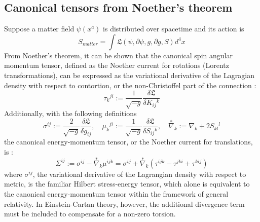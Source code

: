 \documentclass[12pt]{article}
\begin{document}
\subsection{Canonical tensors from Noether's theorem}
Suppose a matter field $\psi(x^a)$ is distributed over spacetime and its action is
\[ S_{matter} = \int \mathfrak{L}(\psi,\partial\psi, g,\partial g, S) d^4x \]
From Noether's theorem, it can be shown that the canonical spin angular momentum tensor, defined as the Noether current for rotations (Lorentz transformations), can be expressed as the variational derivative of the Lagragian density with respect to contortion, or the non-Christoffel part of the connection \cite{hehl1976general}:
\[\tau_k{}^{ji} := \frac{1}{\sqrt{-g}}\frac{\delta\mathfrak{L}}{\delta K_{ij}{}^k}\]
Additionally, with the following definitions
\[ \sigma^{ij} := \frac{2}{\sqrt{-g}}\frac{\delta\mathfrak{L}}{\delta g_{ij}},
\quad \mu_{k}{}^{ji} := \frac{1}{\sqrt{-g}}\frac{\delta\mathfrak{L}}{\delta S_{ij}{}^k},
\quad \stackrel{*}{\nabla}_k := \nabla_k + 2S_{kl}{}^l\]
the canonical energy-momentum tensor, or the Noether current for translations, is \cite{hehl1976general}:
 \[ \Sigma^{ij} := \sigma^{ij} - \stackrel{*}{\nabla}_k\mu^{ijk}  = \sigma^{ij} + \stackrel{*}{\nabla}_k(\tau^{ijk} - \tau^{jki} + \tau^{kij})\]
where $\sigma^{ij}$, the variational derivative of the Lagrangian density with respect to metric, is the familiar Hilbert stress-energy tensor, which alone is equivalent to the canonical energy-momentum tensor within the framework of general relativity. In Einstein-Cartan theory, however, the additional divergence term must be included to compensate for a non-zero torsion.
\end{document}
